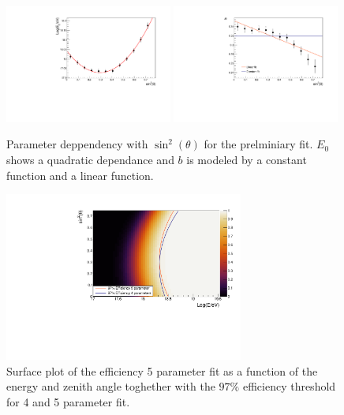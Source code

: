 \documentclass[12pt,a4paper]{article}
\begin{document}
\begin{figure}[h]
\begin{center}
\includegraphics[width=0.49\textwidth]{plots/E0.pdf}
\includegraphics[width=0.49\textwidth]{plots/b.pdf}
\caption{Parameter deppendency with $\sin^2(\theta)$ for the prelminiary fit. $E_0$ shows a quadratic dependance and $b$ is modeled by a constant function and a linear function.
\label{fig:parameters}}
\end{center}
\end{figure} 



\begin{figure}[h]
\begin{center}
\includegraphics[width=0.7\textwidth]{plots/Surface.pdf}
\caption{Surface plot of the efficiency 5 parameter fit as a function of the energy and zenith angle toghether with the $97\%$ efficiency threshold for 4 and 5 parameter fit.
\label{fig:surface}}
\end{center}
\end{figure}  
\end{document}
